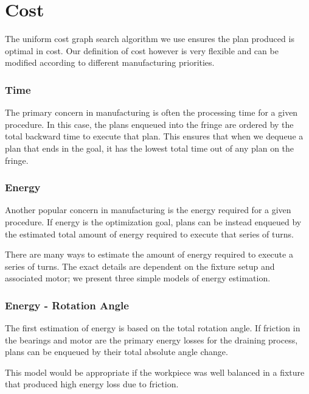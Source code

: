 
\section{Cost}

The uniform cost graph search algorithm we use ensures the plan produced is optimal in cost. Our definition of cost however is very flexible and can be modified according to different manufacturing priorities.

		\subsubsection{Time}

The primary concern in manufacturing is often the processing time for a given procedure. In this case, the plans enqueued into the fringe are ordered by the total backward time to execute that plan. This ensures that when we dequeue a plan that ends in the goal, it has the lowest total time out of any plan on the fringe.

		\subsubsection{Energy}

Another popular concern in manufacturing is the energy required for a given procedure. If energy is the optimization goal, plans can be instead enqueued by the estimated total amount of energy required to execute that series of turns.


There are many ways to estimate the amount of energy required to execute a series of turns. The exact details are dependent on the fixture setup and associated motor; we present three simple models of energy estimation.

		\subsubsection{Energy - Rotation Angle}

The first estimation of energy is based on the total rotation angle. If friction in the bearings and motor are the primary energy losses for the draining process, plans can be enqueued by their total absolute angle change.

This model would be appropriate if the workpiece was well balanced in a fixture that produced high energy loss due to friction.

